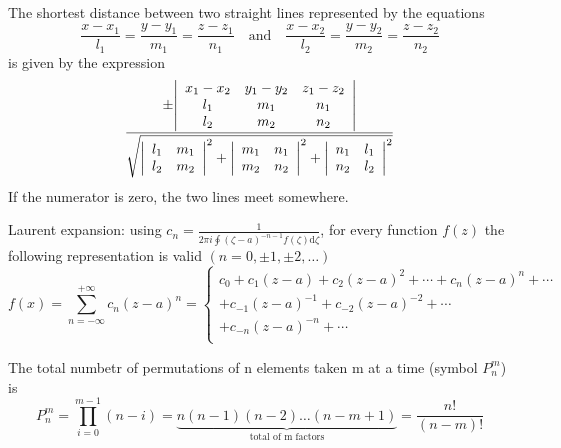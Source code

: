 \documentclass{article}
\begin{document}
    The shortest distance between two straight lines represented by the equations
    \begin{equation}
        \frac{x-x_1}{l_1} = \frac{y-y_1}{m_1} = \frac{z-z_1}{n_1}
        \quad \mbox{and} \quad 
        \frac{x-x_2}{l_2} = \frac{y-y_2}{m_2} = \frac{z-z_2}{n_2}
    \end{equation}
    is given by the expression
    \[
        \frac{
            \pm{\left |
            \begin{array}{*{2}{c@{\quad}}c}
                x_1-x_2 & y_1-y_2 & z_1-z_2 \\
                l_1     & m_1     & n_1 \\
                l_2     & m_2     & n_2 \\
            \end{array}
            \right |}
        }{
            \sqrt{
                {\left | \begin{array}{c@{\quad}c} l_1 & m_1 \\ l_2 & m_2 \\\end{array}\right |}^2
                    +
                {\left | \begin{array}{c@{\quad}c} m_1 & n_1 \\ m_2 & n_2 \\\end{array}\right |}^2
                    +
                {\left | \begin{array}{c@{\quad}c} n_1 & l_1 \\ n_2 & l_2 \\\end{array}\right |}^2
            }
        }
    \]
    If the numerator is zero, the two lines meet somewhere.

    Laurent expansion: using $c_n=\frac{1}{2\pi i \oint(\zeta-a)^{-n-1} f(\zeta) \mathrm{d}\zeta}$, for every
    function $f(z)$ the following representation is valid $(n=0,\pm 1,\pm 2,\ldots)$
    \[
        f(x)=\sum_{n=-\infty}^{+\infty} c_n(z-a)^n={\left \{ \begin{array}{r} c_0+c_1(z-a)+c_2(z-a)^2+\cdots+c_n(z-a)^n+\cdots \\ +c_{-1}(z-a)^{-1}+c_{-2}(z-a)^{-2}+\cdots \\ +c_{-n}(z-a)^{-n}+\cdots \\ \end{array} \right.}
    \] 

    The total numbetr of permutations of n elements taken m at a time (symbol $P_n^m$) is
    \[
        P_n^m = \prod_{i=0}^{m-1}(n-i)=\underbrace{n(n-1)(n-2)\ldots(n-m+1)}_{\mbox{total of m factors}}=\frac{n!}{(n-m)!}
    \]
\end{document}
